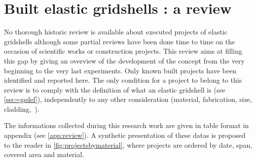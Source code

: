 \clearpage

\section{Built elastic gridshells : a review}\label{sec=review_project}

No thorough historic review is available about executed projects of elastic gridshells although some partial reviews have been done time to time on the occasion of scientific works or construction projects. This review aims at filling this gap by giving an overview of the development of the concept from the very beginning to the very last experiments. Only known built projects have been identified and reported here. The only condition for a project to belong to this review is to comply with the definition of what an elastic gridshell is (see \cref{sec=gsdef}), independently to any other consideration (material, fabrication, size, cladding,~\telp{}).

The informations collected during this research work are given in table format in appendix (see \cref{app:review}). A synthetic presentation of these datas is proposed to the reader in \cref{fig:projectsbymaterial}, where projects are ordered by date, span, covered area and material.

